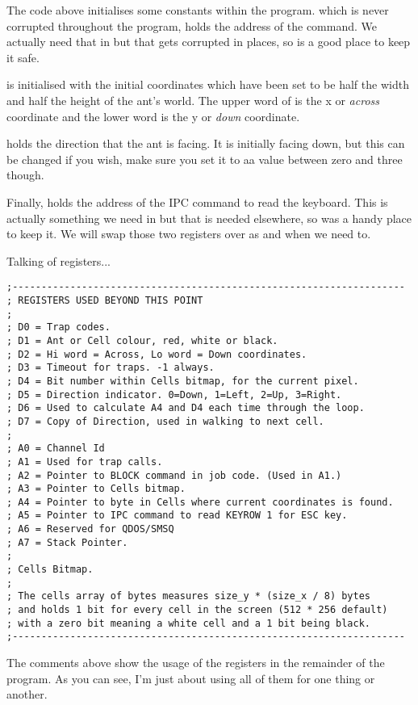 The code above initialises some constants within the program.  which is never corrupted throughout the program, holds the address of the  command. We actually need that in  but that gets corrupted in places, so  is a good place to keep it safe.

 is initialised with the initial coordinates which have been set to be half the width and half the height of the ant's world. The upper word of  is the x or \emph{across} coordinate and the lower word is the y or \emph{down} coordinate. 

 holds the direction that the ant is facing. It is initially facing down, but this can be changed if you wish, make sure you set it to aa value between zero and three though.

Finally,  holds the address of the IPC command to read the keyboard. This is actually something we need in  but that is needed elsewhere, so  was a handy place to keep it. We will swap those two registers over as and when we need to.

Talking of registers...

\begin{lstlisting}[firstnumber=last,caption={Langtons Ant - Register Usage}]
;--------------------------------------------------------------------
; REGISTERS USED BEYOND THIS POINT
;
; D0 = Trap codes.
; D1 = Ant or Cell colour, red, white or black.
; D2 = Hi word = Across, Lo word = Down coordinates.
; D3 = Timeout for traps. -1 always.
; D4 = Bit number within Cells bitmap, for the current pixel.
; D5 = Direction indicator. 0=Down, 1=Left, 2=Up, 3=Right.
; D6 = Used to calculate A4 and D4 each time through the loop.
; D7 = Copy of Direction, used in walking to next cell.
;
; A0 = Channel Id
; A1 = Used for trap calls.
; A2 = Pointer to BLOCK command in job code. (Used in A1.)
; A3 = Pointer to Cells bitmap.
; A4 = Pointer to byte in Cells where current coordinates is found.
; A5 = Pointer to IPC command to read KEYROW 1 for ESC key.
; A6 = Reserved for QDOS/SMSQ
; A7 = Stack Pointer.
;
; Cells Bitmap.
;
; The cells array of bytes measures size_y * (size_x / 8) bytes
; and holds 1 bit for every cell in the screen (512 * 256 default)
; with a zero bit meaning a white cell and a 1 bit being black.
;--------------------------------------------------------------------

\end{lstlisting}

The comments above show the usage of the registers in the remainder of the program. As you can see, I'm just about using all of them for one thing or another.

